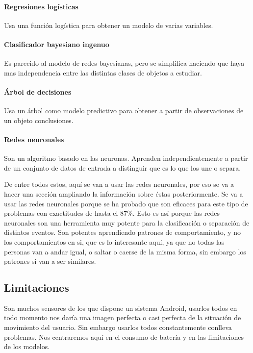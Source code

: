 \documentclass[12pt]{book}
\numberwithin{equation}{section}
\begin{document}
\paragraph{Regresiones logísticas} Usa una función logística para obtener un modelo de varias variables.

\paragraph{Clasificador bayesiano ingenuo} Es parecido al modelo de redes bayesianas, pero se simplifica haciendo que haya mas independencia entre las distintas clases de objetos a estudiar.

\paragraph{Árbol de decisiones} Usa un árbol como modelo predictivo para obtener a partir de observaciones de un objeto conclusiones.

\paragraph{Redes neuronales} Son un algoritmo basado en las neuronas. Aprenden independientemente a partir de un conjunto de datos de entrada a distinguir que es lo que los une o separa.

De entre todos estos, aquí se van a usar las redes neuronales, por eso se va a hacer una sección ampliando la información sobre éstas posteriormente. Se va a usar las redes neuronales porque se ha probado que son eficaces para este tipo de problemas\cite{s131013099} con exactitudes de hasta el 87\%. Esto es así porque las redes neuronales son una herramienta muy potente para la clasificación o separación de distintos eventos. Son potentes aprendiendo patrones de comportamiento, y no los comportamientos en si, que es lo interesante aquí, ya que no todas las personas van a andar igual, o saltar o caerse de la misma forma, sin embargo los patrones si van a ser similares.

\subsection{Limitaciones}

Son muchos sensores de los que dispone un sistema Android, usarlos todos en todo momento nos daría una imagen perfecta o casi perfecta de la situación de movimiento del usuario. Sin embargo usarlos todos constantemente conlleva problemas. Nos centraremos aquí en el consumo de batería y en las limitaciones de los modelos.
\end{document}
